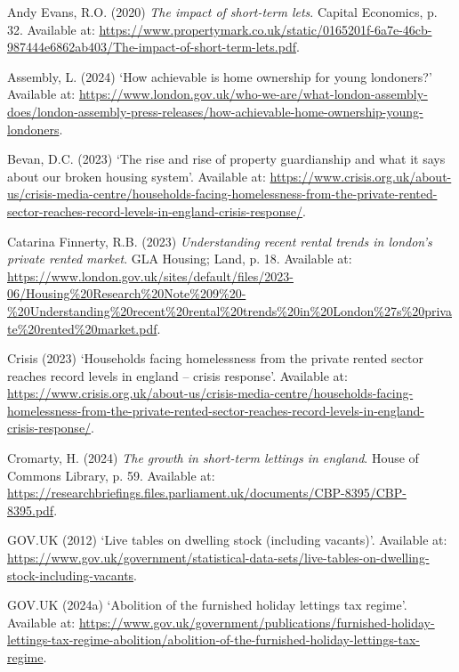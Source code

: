 \documentclass[
  a4paper,
  DIV=11,
  numbers=noendperiod]{scrartcl}
\newlength{\cslhangindent}
\newenvironment{CSLReferences}[2] %
 {\begin{list}{}{%
  \setlength{\itemindent}{0pt}
  \setlength{\leftmargin}{0pt}
  \setlength{\parsep}{0pt}
  \ifodd #1
   \setlength{\leftmargin}{\cslhangindent}
   \setlength{\itemindent}{-1\cslhangindent}
  \fi
  \setlength{\itemsep}{#2\baselineskip}}}
 {\end{list}}
\begin{document}
\label{refs}
\begin{CSLReferences}{0}{1}
Andy Evans, R.O. (2020) \emph{The impact of short-term lets}. Capital
Economics, p. 32. Available at:
\url{https://www.propertymark.co.uk/static/0165201f-6a7e-46cb-987444e6862ab403/The-impact-of-short-term-lets.pdf}.

Assembly, L. (2024) {`How achievable is home ownership for young
londoners?'} Available at:
\url{https://www.london.gov.uk/who-we-are/what-london-assembly-does/london-assembly-press-releases/how-achievable-home-ownership-young-londoners}.

Bevan, D.C. (2023) {`The rise and rise of property guardianship and what
it says about our broken housing system'}. Available at:
\url{https://www.crisis.org.uk/about-us/crisis-media-centre/households-facing-homelessness-from-the-private-rented-sector-reaches-record-levels-in-england-crisis-response/}.

Catarina Finnerty, R.B. (2023) \emph{Understanding recent rental trends
in london's private rented market}. GLA Housing; Land, p. 18. Available
at:
\url{https://www.london.gov.uk/sites/default/files/2023-06/Housing\%20Research\%20Note\%209\%20-\%20Understanding\%20recent\%20rental\%20trends\%20in\%20London\%27s\%20private\%20rented\%20market.pdf}.

Crisis (2023) {`Households facing homelessness from the private rented
sector reaches record levels in england -- crisis response'}. Available
at:
\url{https://www.crisis.org.uk/about-us/crisis-media-centre/households-facing-homelessness-from-the-private-rented-sector-reaches-record-levels-in-england-crisis-response/}.

Cromarty, H. (2024) \emph{The growth in short-term lettings in england}.
House of Commons Library, p. 59. Available at:
\url{https://researchbriefings.files.parliament.uk/documents/CBP-8395/CBP-8395.pdf}.

GOV.UK (2012) {`Live tables on dwelling stock (including vacants)'}.
Available at:
\url{https://www.gov.uk/government/statistical-data-sets/live-tables-on-dwelling-stock-including-vacants}.

GOV.UK (2024a) {`Abolition of the furnished holiday lettings tax
regime'}. Available at:
\url{https://www.gov.uk/government/publications/furnished-holiday-lettings-tax-regime-abolition/abolition-of-the-furnished-holiday-lettings-tax-regime}.


\end{CSLReferences}
\end{document}
